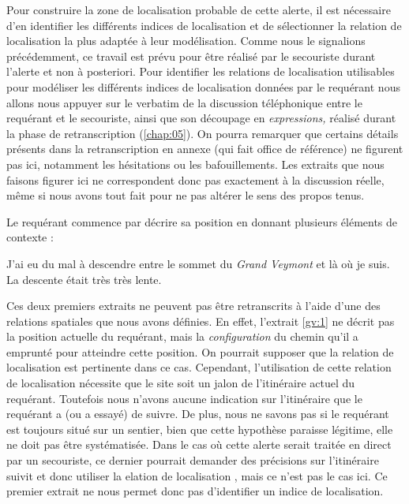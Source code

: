 Pour construire la zone de localisation probable de cette alerte, il
est nécessaire d'en identifier les différents indices de localisation
et de sélectionner la relation de localisation la plus adaptée à leur
modélisation. Comme nous le signalions précédemment, ce travail est
prévu pour être réalisé par le secouriste durant l'alerte et non à
posteriori. Pour identifier les relations de localisation utilisables
pour modéliser les différents indices de localisation données par le
requérant nous allons nous appuyer sur le verbatim de la discussion
téléphonique entre le requérant et le secouriste, ainsi que son
découpage en \emph{expressions,} réalisé durant la phase de
retranscription (\autoref{chap:05}). On pourra remarquer que certains
détails présents dans la retranscription en annexe (qui fait office de
référence) ne figurent pas ici, notamment les hésitations ou les
bafouillements. Les extraits que nous faisons figurer ici ne
correspondent donc pas exactement à la discussion réelle, même si nous
avons tout fait pour ne pas altérer le sens des propos tenus.

Le requérant commence par décrire sa position en donnant plusieurs
éléments de contexte :
%
\begin{dialogue*}
  \Req {} J'ai eu du mal à descendre entre le sommet du
  \emph{Grand Veymont} et là où je suis.  La descente
  était très très lente.
\end{dialogue*}

Ces deux premiers extraits ne peuvent pas être retranscrits à l'aide
d'une des relations spatiales que nous avons définies. En effet,
l'extrait \ref{gv:1} ne décrit pas la position actuelle du requérant,
mais la \emph{configuration} du chemin qu'il a emprunté pour atteindre
cette position. On pourrait supposer que la relation de localisation
 est pertinente dans ce
cas. Cependant, l'utilisation de cette relation de localisation
nécessite que le site soit un jalon de l’itinéraire actuel du
requérant. Toutefois nous n'avons aucune indication sur l’itinéraire
que le requérant a (ou a essayé) de suivre. De plus, nous ne savons
pas si le requérant est toujours situé sur un sentier, bien que cette
hypothèse paraisse légitime, elle ne doit pas être systématisée. Dans
le cas où cette alerte serait traitée en direct par un secouriste, ce
dernier pourrait demander des précisions sur l'itinéraire suivit et
donc utiliser la elation de localisation
, mais ce n'est pas le
cas ici. Ce premier extrait ne nous permet donc pas d'identifier un
indice de localisation.

